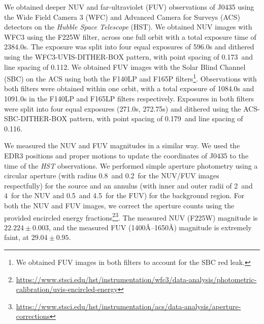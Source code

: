 \documentclass[twocolumn, tighten, times, astrosymb]{aastex631}
\begin{document}
We obtained deeper NUV and far-ultraviolet (FUV) observations of J0435 using the Wide Field Camera 3 (WFC) and Advanced Camera for Surveys (ACS) detectors on the \textit{Hubble Space Telescope} (HST). We obtained NUV images with WFC3 using the F225W filter, across one full orbit with a total exposure time of 2384.0s. The exposure was split into four equal exposures of 596.0s and dithered using the WFC3-UVIS-DITHER-BOX pattern, with point spacing of 0.173\arcsec\ and line spacing of 0.112\arcsec. We obtained FUV images with the Solar Blind Channel (SBC) on the ACS using both the F140LP and F165P filters\footnote{We obtained FUV images in both filters to account for the SBC red leak.}. Observations with both filters were obtained within one orbit, with a total exposure of 1084.0s and 1091.0s in the F140LP and F165LP filters respectively. Exposures in both filters were split into four equal exposures (271.0s, 272.75s) and dithered using the ACS-SBC-DITHER-BOX pattern, with point spacing of 0.179\arcsec\ and line spacing of 0.116\arcsec.

We measured the NUV and FUV magnitudes in a similar way. We used the \Gaia EDR3 positions and proper motions to update the coordinates of J0435 to the time of the \textit{HST} observations. We performed simple aperture photometry using a circular aperture (with radius 0.8\arcsec\ and 0.2\arcsec\ for the NUV/FUV images respectfully) for the source and an annulus (with inner and outer radii of 2\arcsec\ and 4\arcsec\ for the NUV and 0.5\arcsec\ and 4.5\arcsec\ for the FUV) for the background region. For both the NUV and FUV images, we correct the aperture counts using the provided encircled energy fractions\footnote{\url{https://www.stsci.edu/hst/instrumentation/wfc3/data-analysis/photometric-calibration/uvis-encircled-energy}}\footnote{\url{https://www.stsci.edu/hst/instrumentation/acs/data-analysis/aperture-corrections}}. The measured NUV (F225W) magnitude is $22.224\pm0.003$, and the measured FUV (1400\AA--1650\AA) magnitude is extremely faint, at $29.04\pm0.95$.
\end{document}
